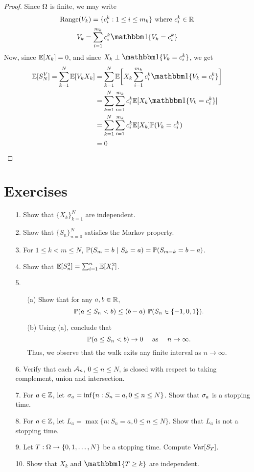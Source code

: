 \documentclass[main]{subfiles}
\begin{document}
\begin{proof}
    Since $ \O $ is finite, we may write
    \[\text{Range}(V_k)=\{c_i^k:1\le i\le m_k\}\text{ where }c_i^k\in\R\]
    \[V_k=\sum_{i=1}^{m_k}c_i^k\one\{V_k=c_i^k\}\]
    Now, since $ \E[X_k]=0 $, and since $ X_k\perp\mathlarger{\one}\{V_k=c_i^k\} $, we get
    \begin{align*}
        \E[S_N^V]=\sum_{k=1}^N\E[V_kX_k] & =\sum_{k=1}^N\E\bigg[X_k\sum_{i=1}^{m_k}c_i^k\one\{V_k=c_i^k\}\bigg] \\
                                         & = \sum_{k=1}^N\sum_{i=1}^{m_k}c_i^k\E[X_k\one\{V_k=c_i^k\}]          \\
                                         & = \sum_{k=1}^N\sum_{i=1}^{m_k}c_i^k\E[X_k]\P(V_k=c_i^k)              \\
                                         & = 0
    \end{align*}
\end{proof}

\section{Exercises}
\begin{itemize}
    \item[1.]Show that $ \{X_k\}_{k=1}^N $ are independent.
    \item[2.]Show that $ \{S_n\}_{n=0}^N $ satisfies the Markov property.
    \item[3.]For $ 1\le k<m\le N $, $ \P(S_m=b\ |\ S_k=a)=\P(S_{m-k}=b-a) $.
    \item[4.]Show that $ \E[S_n^2]=\sum_{i=1}^n\E[X_i^2] $.
    \item[5.]
        \begin{itemize}
            \item[(a)]Show that for any $ a,b\in\R $, \[\P(a\le S_n < b)\le (b-a)\ \P(S_n\in\{-1,0,1\}).\]
            \item[(b)]Using (a), conclude that \[\P(a\le S_n < b) \to 0 \text{$\quad$ as$\quad$ } n\to\infty.\] Thus, we observe that the walk exits any finite interval as $ n\to\infty $.
        \end{itemize}
        \item[6.]Verify that each $ \A_n $, $ 0\le n\le N $, is closed with respect to taking complement, union and intersection.
        \item[7.]For $ a\in\Z $, let $ \s_a=\inf\{n: S_n=a, 0\le n\le N\} $. Show that $ \s_a $ is a stopping time.
        \item[8.]For $ a\in\Z $, let $ L_a=\max\{n: S_n=a, 0\le n\le N\}$. Show that $ L_a $ is not a stopping time.
        \item[9.]Let $ T:\O\to\{0,1,\ldots,N\} $ be a stopping time. Compute $ \Var[S_T] $.
        \item[10.]Show that $ X_k $ and $ \mathlarger{\one\{T\ge k\}} $ are independent.
\end{itemize}
\end{document}
